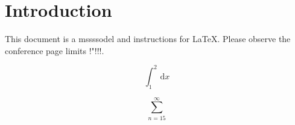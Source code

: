 \section{Introduction}
This document is a mssssodel and instructions for \LaTeX.
Please observe the conference page limits !"!!!. 

\begin{equation}
    \int_{1}^{2}  \,\mathrm{d}x 
\end{equation}

\begin{equation}
        \sum_{n = 15}^{\infty}  
\end{equation}